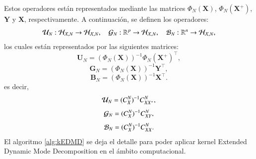 Estos operadores están representados mediante las matrices \( \Phi_N (\mathbf{X}) \), \( \Phi_N (\mathbf{X}^+) \), \( \mathbf{Y} \) y \( \mathbf{X} \), respectivamente. A continuación, se definen los operadores:
\begin{equation*}
    \mathcal{U}_N : \mathcal{H}_{\mathcal{X}, N} \to \mathcal{H}_{\mathcal{X}, N}, \quad \mathcal{G}_N : \mathbb{R}^p \to \mathcal{H}_{\mathcal{X}, N}, \quad \mathcal{B}_N : \mathbb{R}^n \to \mathcal{H}_{\mathcal{X}, N},
\end{equation*}
los cuales están representados por las siguientes matrices:
\begin{equation*}
    \mathbf{U}_N = (\Phi_N (\mathbf{X}))^{-1} \Phi_N (\mathbf{X}^+)^\top,
\end{equation*}
\begin{equation*}
    \mathbf{G}_N = (\Phi_N (\mathbf{X}))^{-1} \mathbf{Y}^\top,
\end{equation*}
\begin{equation*}
    \mathbf{B}_N = (\Phi_N (\mathbf{X}))^{-1} \mathbf{X}^\top.
\end{equation*}
es decir,
\begin{equation*}
    \mathcal{U}_N = (C_X^N)^{-1} C_{XX^+}^N,
\end{equation*}
\begin{equation*}
    \mathcal{G}_N = (C_X^N)^{-1} C_{XY}^N,
\end{equation*}
\begin{equation*}
    \mathcal{B}_N = (C_X^N)^{-1} C_{XX}^N.
\end{equation*}
El algoritmo \ref{alg:kEDMD} se deja el detalle para poder aplicar kernel Extended Dynamic Mode Decomposition en el ámbito computacional.
